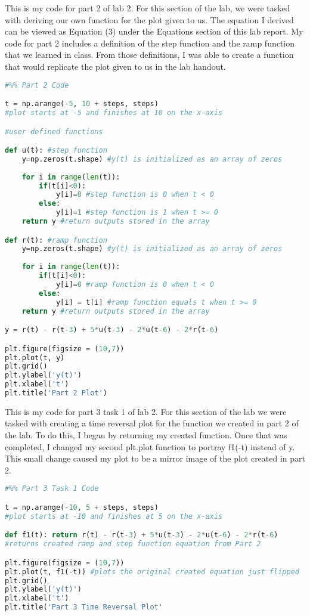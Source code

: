 \documentclass[12pt]{report}
\begin{document}
{This is my code for part 2 of lab 2. For this section of the lab, we were tasked with deriving our own function for the plot given to us. The equation I derived can be viewed as Equation (3) under the Equations section of this lab report. My code for part 2 includes a definition of the step function and the ramp function that we learned in class. From those definitions, I was able to create a function that would replicate the plot given to us in the lab handout.  }
\begin{lstlisting}[language=Python]
#%% Part 2 Code

t = np.arange(-5, 10 + steps, steps) 
#plot starts at -5 and finishes at 10 on the x-axis

#user defined functions

def u(t): #step function
    y=np.zeros(t.shape) #y(t) is initialized as an array of zeros
    
    for i in range(len(t)):
        if(t[i]<0):
            y[i]=0 #step function is 0 when t < 0
        else:
            y[i]=1 #step function is 1 when t >= 0
    return y #return outputs stored in the array

def r(t): #ramp function
    y=np.zeros(t.shape) #y(t) is initialized as an array of zeros
    
    for i in range(len(t)):
        if(t[i]<0):
            y[i]=0 #ramp function is 0 when t < 0
        else:
            y[i] = t[i] #ramp function equals t when t >= 0
    return y #return outputs stored in the array

y = r(t) - r(t-3) + 5*u(t-3) - 2*u(t-6) - 2*r(t-6)

plt.figure(figsize = (10,7))
plt.plot(t, y)
plt.grid()
plt.ylabel('y(t)')
plt.xlabel('t')
plt.title('Part 2 Plot')
\end{lstlisting}

{This is my code for part 3 task 1 of lab 2. For this section of the lab we were tasked with creating a time reversal plot for the function we created in part 2 of the lab. To do this, I began by returning my created function. Once that was completed, I changed my second plt.plot function to portray f1(-t) instead of y. This small change caused my plot to be a mirror image of the plot created in part 2.}
\begin{lstlisting}[language=Python]
#%% Part 3 Task 1 Code

t = np.arange(-10, 5 + steps, steps) 
#plot starts at -10 and finishes at 5 on the x-axis

def f1(t): return r(t) - r(t-3) + 5*u(t-3) - 2*u(t-6) - 2*r(t-6)
#returns created ramp and step function equation from Part 2

plt.figure(figsize = (10,7))
plt.plot(t, f1(-t)) #plots the original created equation just flipped
plt.grid()
plt.ylabel('y(t)')
plt.xlabel('t')
plt.title('Part 3 Time Reversal Plot'
\end{lstlisting}
\end{document}
